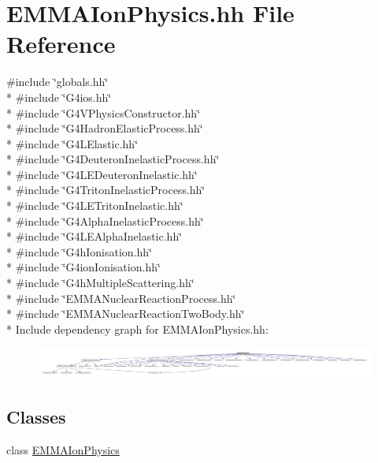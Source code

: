 \hypertarget{EMMAIonPhysics_8hh}{}\section{E\+M\+M\+A\+Ion\+Physics.\+hh File Reference}
\label{EMMAIonPhysics_8hh}
{\ttfamily \#include \char`\"{}globals.\+hh\char`\"{}}\\*
{\ttfamily \#include \char`\"{}G4ios.\+hh\char`\"{}}\\*
{\ttfamily \#include \char`\"{}G4\+V\+Physics\+Constructor.\+hh\char`\"{}}\\*
{\ttfamily \#include \char`\"{}G4\+Hadron\+Elastic\+Process.\+hh\char`\"{}}\\*
{\ttfamily \#include \char`\"{}G4\+L\+Elastic.\+hh\char`\"{}}\\*
{\ttfamily \#include \char`\"{}G4\+Deuteron\+Inelastic\+Process.\+hh\char`\"{}}\\*
{\ttfamily \#include \char`\"{}G4\+L\+E\+Deuteron\+Inelastic.\+hh\char`\"{}}\\*
{\ttfamily \#include \char`\"{}G4\+Triton\+Inelastic\+Process.\+hh\char`\"{}}\\*
{\ttfamily \#include \char`\"{}G4\+L\+E\+Triton\+Inelastic.\+hh\char`\"{}}\\*
{\ttfamily \#include \char`\"{}G4\+Alpha\+Inelastic\+Process.\+hh\char`\"{}}\\*
{\ttfamily \#include \char`\"{}G4\+L\+E\+Alpha\+Inelastic.\+hh\char`\"{}}\\*
{\ttfamily \#include \char`\"{}G4h\+Ionisation.\+hh\char`\"{}}\\*
{\ttfamily \#include \char`\"{}G4ion\+Ionisation.\+hh\char`\"{}}\\*
{\ttfamily \#include \char`\"{}G4h\+Multiple\+Scattering.\+hh\char`\"{}}\\*
{\ttfamily \#include \char`\"{}E\+M\+M\+A\+Nuclear\+Reaction\+Process.\+hh\char`\"{}}\\*
{\ttfamily \#include \char`\"{}E\+M\+M\+A\+Nuclear\+Reaction\+Two\+Body.\+hh\char`\"{}}\\*
Include dependency graph for E\+M\+M\+A\+Ion\+Physics.\+hh\+:
\nopagebreak
\begin{figure}[H]
\begin{center}
\leavevmode
\includegraphics[width=350pt]{EMMAIonPhysics_8hh__incl}
\end{center}
\end{figure}
\subsection*{Classes}
\begin{DoxyCompactItemize}
\item 
class \hyperlink{classEMMAIonPhysics}{E\+M\+M\+A\+Ion\+Physics}
\end{DoxyCompactItemize}
